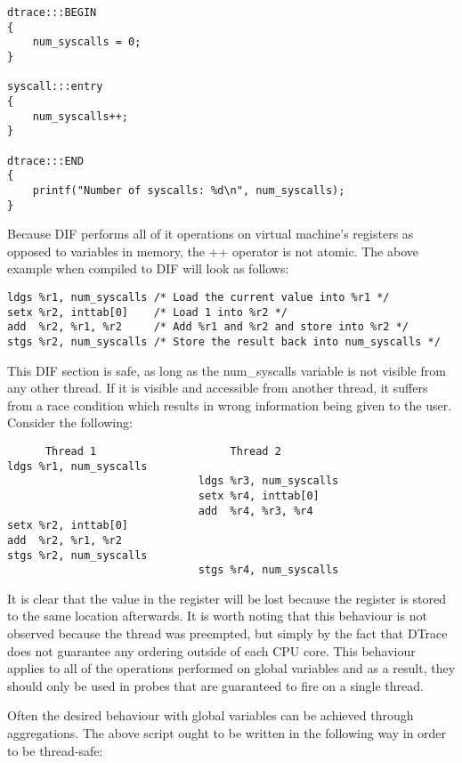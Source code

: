 \begin{verbatim}
dtrace:::BEGIN
{
    num_syscalls = 0;
}

syscall:::entry
{
    num_syscalls++;
}

dtrace:::END
{
    printf("Number of syscalls: %d\n", num_syscalls);
}
\end{verbatim}

\noindent
Because DIF performs all of it operations on virtual machine's registers as
opposed to variables in memory, the ++ operator is not atomic. The above example
when compiled to DIF will look as follows:

\begin{verbatim}
ldgs %r1, num_syscalls /* Load the current value into %r1 */
setx %r2, inttab[0]    /* Load 1 into %r2 */
add  %r2, %r1, %r2     /* Add %r1 and %r2 and store into %r2 */
stgs %r2, num_syscalls /* Store the result back into num_syscalls */
\end{verbatim}

\noindent
This DIF section is safe, as long as the num\_syscalls variable is not visible
from any other thread. If it is visible and accessible from another thread, it
suffers from a race condition which results in wrong information being given to
the user. Consider the following:

\begin{verbatim}
      Thread 1                     Thread 2
ldgs %r1, num_syscalls
                              ldgs %r3, num_syscalls
                              setx %r4, inttab[0]
                              add  %r4, %r3, %r4
setx %r2, inttab[0]
add  %r2, %r1, %r2
stgs %r2, num_syscalls
                              stgs %r4, num_syscalls
\end{verbatim}

\noindent
It is clear that the value in the  register will be lost because
the register  is stored to the same location afterwards. It is
worth noting that this behaviour is not observed because the thread was
preempted, but simply by the fact that DTrace does not guarantee any ordering
outside of each CPU core. This behaviour applies to all of the operations
performed on global variables and as a result, they should only be used in
probes that are guaranteed to fire on a single thread.

\noindent
Often the desired behaviour with global variables can be achieved through
aggregations. The above script ought to be written in the following way in order
to be thread-safe:

